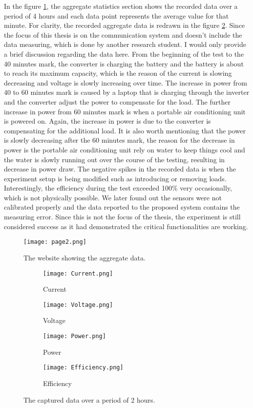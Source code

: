 \documentclass[../thesis.tex]{subfiles}
\begin{document}
In the figure \ref{fig:page2}, the aggregate statistics section shows the recorded data over a period of 4 hours and each data point represents the average value for that minute. For clarity, the recorded aggregate data is redrawn in the figure \ref{fig:captured}. Since the focus of this thesis is on the communication system and doesn't include the data measuring, which is done by another research student. I would only provide a brief discussion regarding the data here. From the beginning of the test to the 40 minutes mark, the converter is charging the battery and the battery is about to reach its maximum capacity, which is the reason of the current is slowing decreasing and voltage is slowly increasing over time. The increase in power from 40 to 60 minutes mark is caused by a laptop that is charging through the inverter and the converter adjust the power to compensate for the load. The further increase in power from 60 minutes mark is when a portable air conditioning unit is powered on. Again, the increase in power is due to the converter is compensating for the additional load. It is also worth mentioning that the power is slowly decreasing after the 60 minutes mark, the reason for the decrease in power is the portable air conditioning unit rely on water to keep things cool and the water is slowly running out over the course of the testing, resulting in decrease in power draw. The negative spikes in the recorded data is when the experiment setup is being modified such as introducing or removing loads. Interestingly, the efficiency during the test exceeded 100\% very occasionally, which is not physically possible. We later found out the sensors were not calibrated properly and the data reported to the proposed system contains the measuring error. Since this is not the focus of the thesis, the experiment is still considered success as it had demonstrated the critical functionalities are working. 

\begin{figure}[!ht]
	\centering
	\texttt{[image: page2.png]}
	\caption{The website showing the aggregate data.}
	\label{fig:page2}
\end{figure}

\begin{figure}[!ht]
	\centering
	\begin{subfigure}[b]{0.49\linewidth}
		\texttt{[image: Current.png]}
		\caption{Current}
	\end{subfigure}
	\begin{subfigure}[b]{0.49\linewidth}
		\texttt{[image: Voltage.png]}
		\caption{Voltage}
	\end{subfigure}
	\begin{subfigure}[b]{0.49\linewidth}
		\texttt{[image: Power.png]}
		\caption{Power}
	\end{subfigure}
	\begin{subfigure}[b]{0.49\linewidth}
		\texttt{[image: Efficiency.png]}
		\caption{Efficiency}
	\end{subfigure}
	\caption{The captured data over a period of 2 hours.}
	\label{fig:captured}
\end{figure}
\end{document}
